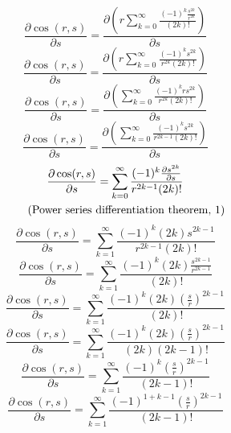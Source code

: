 \documentclass[a4paper,12pt]{report}
\newcommand{\equationnote}[1]{%
    \refstepcounter{equation}%
    \tag{#1, \theequation}%
}
\begin{document}
\begin{equation}
\frac{\partial \cos(r,s)}{\partial s} = \frac{\partial \left(r \sum \limits_{k=0}^{\infty} \frac{(-1)^k \frac{s^{2k}}{r^{2k}}}{(2k)!}\right)}{\partial s}
\end{equation}
\begin{equation}
\frac{\partial \cos(r,s)}{\partial s} = \frac{\partial \left(r \sum \limits_{k=0}^{\infty} \frac{(-1)^k s^{2k}}{r^{2k} (2k)!}\right)}{\partial s}
\end{equation}
\begin{equation}
\frac{\partial \cos(r,s)}{\partial s} = \frac{\partial \left(\sum \limits_{k=0}^{\infty} \frac{(-1)^k rs^{2k}}{r^{2k} (2k)!}\right)}{\partial s}
\end{equation}
\begin{equation}
\frac{\partial \cos(r,s)}{\partial s} = \frac{\partial \left(\sum \limits_{k=0}^{\infty} \frac{(-1)^k s^{2k}}{r^{2k-1} (2k)!}\right)}{\partial s}
\end{equation}
\begin{gather}
\frac{\partial \cos(r,s)}{\partial s} = \sum \limits_{k=0}^{\infty} \frac{(-1)^k \frac{\partial s^{2k}}{\partial s}}{r^{2k-1} (2k)!} \notag \\
\equationnote{Power series differentiation theorem}
\end{gather}
\begin{equation}
\frac{\partial \cos(r,s)}{\partial s} = \sum \limits_{k=1}^{\infty} \frac{(-1)^k (2k) s^{2k-1}}{r^{2k-1} (2k)!}
\end{equation}
\begin{equation}
\frac{\partial \cos(r,s)}{\partial s} = \sum \limits_{k=1}^{\infty} \frac{(-1)^k (2k) \frac{s^{2k-1}}{r^{2k-1}}}{(2k)!}
\end{equation}
\begin{equation}
\frac{\partial \cos(r,s)}{\partial s} = \sum \limits_{k=1}^{\infty} \frac{(-1)^k (2k) \left(\frac{s}{r}\right)^{2k-1}}{(2k)!}
\end{equation}
\begin{equation}
\frac{\partial \cos(r,s)}{\partial s} = \sum \limits_{k=1}^{\infty} \frac{(-1)^k (2k) \left(\frac{s}{r}\right)^{2k-1}}{(2k) (2k-1)!}
\end{equation}
\begin{equation}
\frac{\partial \cos(r,s)}{\partial s} = \sum \limits_{k=1}^{\infty} \frac{(-1)^k \left(\frac{s}{r}\right)^{2k-1}}{(2k-1)!}
\end{equation}
\begin{equation}
\frac{\partial \cos(r,s)}{\partial s} = \sum \limits_{k=1}^{\infty} \frac{(-1)^{1+k-1} \left(\frac{s}{r}\right)^{2k-1}}{(2k-1)!}
\end{equation}
\end{document}
